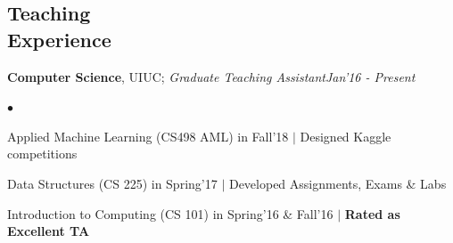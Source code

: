 \documentclass[margin,line]{res}
\newenvironment{list2}{
  \begin{list}{$\bullet$}{%
      \setlength{\itemsep}{0in}
      \setlength{\parsep}{0in} \setlength{\parskip}{0in}
      \setlength{\topsep}{0in} \setlength{\partopsep}{0in} 
      \setlength{\leftmargin}{0.2in}}}{\end{list}}
\begin{document}
\begin{resume}
\section{\sc \large Teaching \\ Experience}
{\bf Computer Science}, UIUC; {\em Graduate Teaching Assistant}\hfill {\em Jan'16 - Present}\vspace*{-0.12in}\\
\begin{list2}
\item Applied Machine Learning (CS498 AML) in Fall'18 $|$ Designed Kaggle competitions 
\item Data Structures (CS 225) in Spring'17 $|$ Developed Assignments, Exams \& Labs
\item Introduction to Computing (CS 101) in Spring'16 \& Fall'16 $|$ \bf{Rated as Excellent TA}
\end{list2}


\end{resume}
\end{document}
